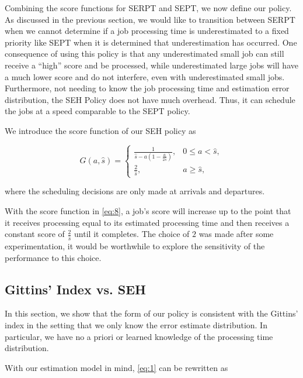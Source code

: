 Combining the score functions for SERPT and SEPT, we now define our policy. As discussed in the previous section, we would like to transition between SERPT when we cannot determine if a job processing time is underestimated to a fixed priority like SEPT when it is determined that underestimation has occurred. One consequence of using this policy is that any underestimated small job can still receive a ``high'' score and be processed, while underestimated large jobs will have a much lower score and do not interfere, even with underestimated small jobs.  Furthermore, not needing to know the job processing time and estimation error distribution, the SEH Policy does not have much overhead. Thus, it can schedule the jobs at a speed comparable to the SEPT policy. 

We introduce the score function of our SEH policy as 




\begin {equation}\label{eq:8}
G(a,\hat{s})=
\begin{cases}
\frac{1}{{\hat s - a(1 - \frac{a}{{2\hat s}})}}, & 0 \le a < \hat s,\\
\frac{2}{{\hat s}}, & a \ge \hat s,
\end{cases}
\end{equation}

\noindent where the scheduling decisions are only made at arrivals and departures. 

With the score function in \eqref{eq:8}, a job's score will increase up to the point that
it receives processing equal to its estimated processing time and then receives a constant score of
$\frac{2}{{\hat s}}$ until it completes. The choice of $2$ was made after some experimentation, it would be worthwhile to explore the sensitivity of the performance to this choice.

\subsection{Gittins' Index vs. SEH} \label{GittinsVsSEH}
In this section, we show that the form of our policy is consistent with the Gittins' index in the setting that we only know the error estimate distribution. In particular, we have no a priori or learned knowledge of the processing time distribution. 





With our estimation model in mind, \eqref{eq:1} can be rewritten as 


